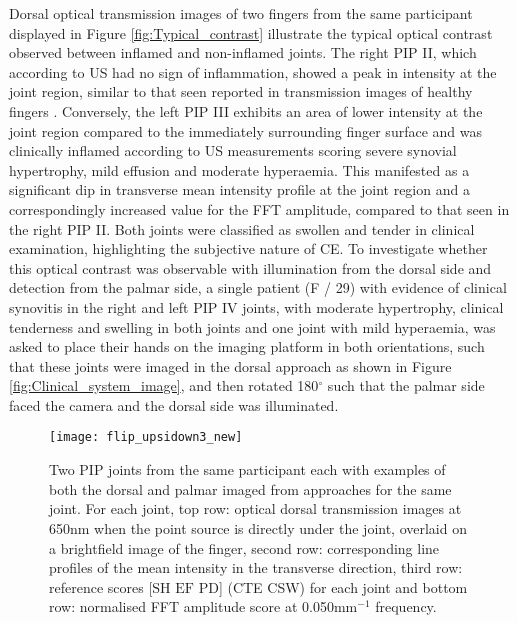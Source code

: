 \documentclass[twoside]{bhamthesis}
\theoremstyle{definition}
\begin{document}
Dorsal optical transmission images of two fingers from the same participant displayed in Figure \ref{fig:Typical_contrast} illustrate the typical optical contrast observed between inflamed and non-inflamed joints. The right PIP II, which according to US had no sign of inflammation, showed a peak in intensity at the joint region, similar to that seen reported in transmission images of healthy fingers \cite{lighter2018multispectral}. Conversely, the left PIP III exhibits an area of lower intensity at the joint region compared to the immediately surrounding finger surface and was clinically inflamed according to US measurements scoring severe synovial hypertrophy, mild effusion and moderate hyperaemia. This manifested as a significant dip in transverse mean intensity profile at the joint region and a correspondingly increased value for the FFT amplitude, compared to that seen in the right PIP II. Both joints were classified as swollen and tender in clinical examination, highlighting the subjective nature of CE. 
To investigate whether this optical contrast was observable with illumination from the dorsal side and detection from the palmar side, a single patient (F / 29) with evidence of clinical synovitis in the right and left PIP IV joints, with moderate hypertrophy, clinical tenderness and swelling in both joints and one joint with mild hyperaemia, was asked to place their hands on the imaging platform in both orientations, such that these joints were imaged in the dorsal approach as shown in Figure \ref{fig:Clinical_system_image}, and then rotated 180$^\circ$ such that the palmar side faced the camera and the dorsal side was illuminated.

\begin{figure}[!ht]
\centering\texttt{[image: flip\_upsidown3\_new]}\caption{Two PIP joints from the same participant each with examples of both the dorsal and palmar imaged from approaches for the same joint. For each joint, top row: optical dorsal transmission images at 650nm when the point source is directly under the joint, overlaid on a brightfield image of the finger, second row: corresponding line profiles of the mean intensity in the transverse direction, third row: reference scores  [$\mathrm{SH}$ $\mathrm{EF}$ $\mathrm{PD}$] (CTE CSW) for each joint and bottom row: normalised FFT amplitude score at 0.050mm$^{-1}$ frequency.}
  \label{fig:spectral_change}
\end{figure}
\end{document}
